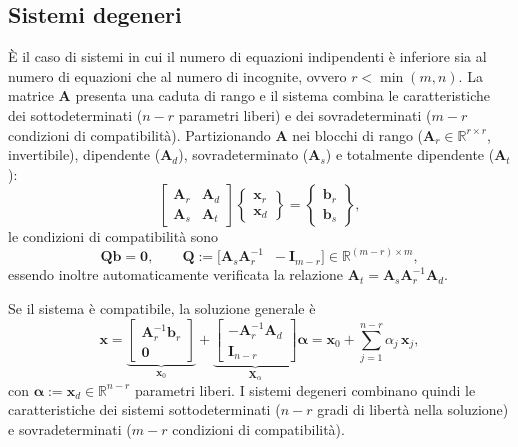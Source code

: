 \subsection{Sistemi degeneri}\label{par:degeneri}

È il caso di sistemi in cui il numero di equazioni indipendenti è inferiore sia al numero di equazioni che al numero di incognite, 
ovvero $r<\min(m,n)$. La matrice $\bm{A}$ presenta una caduta di rango e il sistema combina le caratteristiche dei sottodeterminati ($n-r$ parametri liberi) e dei sovradeterminati ($m-r$ condizioni di compatibilità). Partizionando $\bm{A}$ nei blocchi di rango ($\bm{A}_r \in \mathbb{R}^{r \times r}$, invertibile), dipendente ($\bm{A}_d$), sovradeterminato ($\bm{A}_s$) e totalmente dipendente ($\bm{A}_t$):
\begin{equation}\label{eq:sist_deg}
	\left[ \begin{array}{c|c}
		\bm{A}_r & \bm{A}_d \\
		\hline
		\bm{A}_s & \bm{A}_t
	\end{array} \right]
	\left\{ \begin{array}{c}
		\bm{x}_r \\ \hline \bm{x}_d
	\end{array} \right\} =
	\left\{ \begin{array}{c}
		\bm{b}_r \\ \hline \bm{b}_s
	\end{array} \right\},
\end{equation}
le condizioni di compatibilit\`a sono
\begin{equation}\label{eq:comp_deg}
	\bm{Q} \bm{b} = \bm{0},
	\qquad
	\bm{Q} := \bigl[\bm{A}_{s}\bm{A}_{r}^{-1} \;\; -\bm{I}_{m-r}\bigr] \in \mathbb{R}^{(m-r)\times m},
\end{equation}
essendo inoltre automaticamente verificata la relazione $\bm{A}_t = \bm{A}_s\bm{A}_r^{-1}\bm{A}_d$.

Se il sistema \`e compatibile, la soluzione generale \`e
\begin{equation}\label{eq:sol_deg}
	\bm{x} = \underbrace{\begin{bmatrix} \bm{A}_r^{-1}\bm{b}_r \\ \bm{0} \end{bmatrix}}_{\bm{x}_0}
	+ \underbrace{\begin{bmatrix} -\bm{A}_r^{-1}\bm{A}_d \\ \bm{I}_{n-r} \end{bmatrix}}_{\bm{X}_\alpha} \bm{\alpha}	= \bm{x}_0 + \sum_{j=1}^{n-r} \alpha_j\,\bm{x}_j,
\end{equation}
con $\bm{\alpha} := \bm{x}_d \in \mathbb{R}^{n-r}$ parametri liberi. I sistemi degeneri combinano quindi le caratteristiche dei sistemi sottodeterminati ($n-r$ gradi di libert\`a nella soluzione) e sovradeterminati ($m-r$ condizioni di compatibilit\`a).


